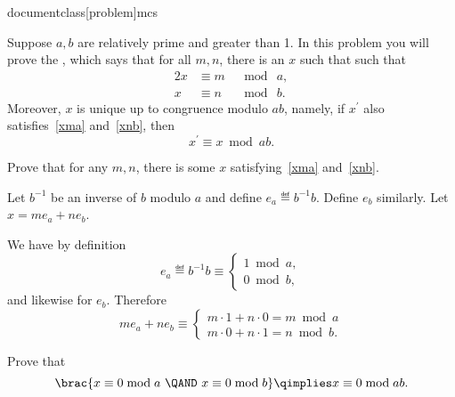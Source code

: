 documentclass[problem]{mcs}

\begin{pcomments}
\end{pcomments}



\begin{problem}
  Suppose $a, b$ are relatively prime and greater than 1.  In this
  problem you will prove the , which
  says that for all $m,n$, there is an $x$ such that
    such that
\begin{alignat}{2}
   x &\equiv m &\ \bmod\ a,\label{xma}\\
   x &\equiv n &\ \bmod\ b.\label{xnb}
\end{alignat}
  Moreover, $x$ is unique up to congruence modulo $ab$, namely, if
  $x^\prime$ also satisfies~\eqref{xma} and~\eqref{xnb}, then
\[
x^\prime \equiv x \bmod{ab}.
\]

\bparts

\ppart\label{exmaxnb} Prove that for any $m,n$, there is some $x$
satisfying~\eqref{xma} and~\eqref{xnb}.

\hint Let $b^{-1}$ be an inverse of $b$ modulo $a$ and define $e_a \eqdef
b^{-1}b$.  Define $e_b$ similarly.  Let $x = me_a + ne_b$.

\begin{solution}
We have by definition
\[
e_a \eqdef b^{-1}b \equiv
\begin{cases}
  1 \bmod a,\\
  0 \bmod b,
\end{cases}
\]
and likewise for $e_b$.  Therefore
\[
m e_a+ n e_b \equiv \begin{cases}
                 m\cdot 1 + n \cdot 0 = m \bmod a\\
                 m\cdot 0 + n \cdot 1 = n \bmod b.
                    \end{cases}
\]
\end{solution}

\ppart\label{0congcase} Prove that
\[
\brac{x \equiv 0 \bmod a \ \QAND\  x \equiv 0 \bmod b} \qimplies x \equiv 0 \bmod{ab}.
\]


\end{problem}
